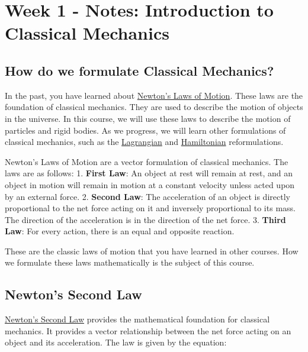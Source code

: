 \section{Week 1 - Notes: Introduction to Classical
Mechanics}\label{week-1---notes-introduction-to-classical-mechanics}

\subsection{How do we formulate Classical
Mechanics?}\label{how-do-we-formulate-classical-mechanics}

In the past, you have learned about
\href{https://en.wikipedia.org/wiki/Newton\%27s_laws_of_motion}{Newton's
Laws of Motion}. These laws are the foundation of classical mechanics.
They are used to describe the motion of objects in the universe. In this
course, we will use these laws to describe the motion of particles and
rigid bodies. As we progress, we will learn other formulations of
classical mechanics, such as the
\href{https://en.wikipedia.org/wiki/Lagrangian_mechanics}{Lagrangian}
and
\href{https://en.wikipedia.org/wiki/Hamiltonian_mechanics}{Hamiltonian}
reformulations.

Newton's Laws of Motion are a vector formulation of classical mechanics.
The laws are as follows: 1. \textbf{First Law}: An object at rest will
remain at rest, and an object in motion will remain in motion at a
constant velocity unless acted upon by an external force. 2.
\textbf{Second Law}: The acceleration of an object is directly
proportional to the net force acting on it and inversely proportional to
its mass. The direction of the acceleration is in the direction of the
net force. 3. \textbf{Third Law}: For every action, there is an equal
and opposite reaction.

These are the classic laws of motion that you have learned in other
courses. How we formulate these laws mathematically is the subject of
this course.

\subsection{Newton's Second Law}\label{newtons-second-law}

\href{https://en.wikipedia.org/wiki/Newton\%27s_laws_of_motion\#Newton's_second_law}{Newton's
Second Law} provides the mathematical foundation for classical
mechanics. It provides a vector relationship between the net force
acting on an object and its acceleration. The law is given by the
equation:

